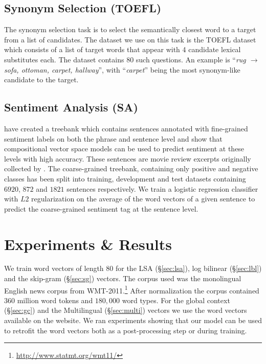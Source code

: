 \documentclass[11pt]{article}
\begin{document}
\subsection{Synonym Selection (TOEFL)}
\label{ref:toefl}

The synonym selection task is to select the semantically closest word to a target from a list of candidates. The dataset we use on this task is the TOEFL dataset \cite{landauer:1997} which consists of a list of target words that appear with 4 candidate lexical substitutes each. The dataset contains 80 such questions. An example is ``\textit{rug $\rightarrow$ sofa, ottoman, carpet, hallway}'', with ``\textit{carpet}'' being the most synonym-like candidate to the target.

\subsection{Sentiment Analysis (SA)}
\label{sec:senti}

 have created a treebank which contains sentences
annotated with fine-grained sentiment labels on both the phrase and sentence level
and show that compositional vector space models can be used to predict sentiment
at these levels with high accuracy.
These sentences are movie review excerpts originally collected by .
The coarse-grained treebank, containing only positive and negative 
classes has been split into training, development and test datasets containing $6920$, $872$ and 
$1821$ sentences respectively. We train a logistic regression classifier with $L2$ regularization
on the average of the word 
vectors of a given sentence to predict the coarse-grained sentiment tag at the sentence level.

\section{Experiments \& Results}
\label{sec:expts}

We train word vectors of length $80$ for the LSA (\S\ref{sec:lsa}), log bilinear (\S\ref{sec:lbl}) 
and the skip-gram (\S\ref{sec:sg}) vectors. The corpus used was the monolingual English news corpus from 
WMT-2011.\footnote{\url{http://www.statmt.org/wmt11/}} After normalization the corpus 
contained $360$ million word tokens and $180,000$ word types. For the global context 
(\S\ref{sec:gc}) and the Multilingual (\S\ref{sec:multi}) vectors
we use the word vectors available on the website.
We ran experiments showing that our model can be used to retrofit the word vectors both
as a post-processing step or during training.
\end{document}
